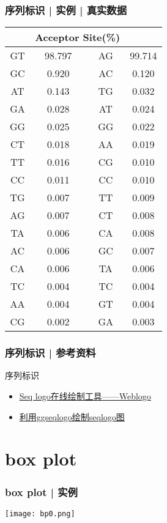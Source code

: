 \begin{frame}
  \frametitle{序列标识 | 实例 | 真实数据}
  \begin{table}
    \centering
    \begin{tabular}{cc|cc}
      \hline
      \rowcolor{blue!50} \multicolumn{2}{c|}{Donor Site(\%)} & \multicolumn{2}{c}{Acceptor Site(\%)}\\
      \hline
      GT & 98.797 & AG & 99.714\\
      GC & 0.920 & AC & 0.120\\
      AT & 0.143 & TG & 0.032\\
      GA & 0.028 & AT & 0.024\\
      GG & 0.025 & GG & 0.022\\
      CT & 0.018 & AA & 0.019\\
      TT & 0.016 & CG & 0.010\\
      CC & 0.011 & CC & 0.010\\
      TG & 0.007 & TT & 0.009\\
      AG & 0.007 & CT & 0.008\\
      TA & 0.006 & CA & 0.008\\
      AC & 0.006 & GC & 0.007\\
      CA & 0.006 & TA & 0.006\\
      TC & 0.004 & TC & 0.004\\
      AA & 0.004 & GT & 0.004\\
      CG & 0.002 & GA & 0.003\\
      \hline
    \end{tabular}
  \end{table}
\end{frame}

\begin{frame}
  \frametitle{序列标识 | 参考资料}
  \begin{block}{序列标识}
    \begin{itemize}
      \item \href{https://www.plob.org/article/14425.html}{Seq logo在线绘制工具——Weblogo}
      \item \href{https://www.plob.org/article/12630.html}{利用ggseqlogo绘制seqlogo图}
    \end{itemize}
  \end{block}
\end{frame}

\section{box plot}
\begin{frame}
  \frametitle{box plot | 实例}
  \begin{center}
    \texttt{[image: bp0.png]}
  \end{center}
\end{frame}

